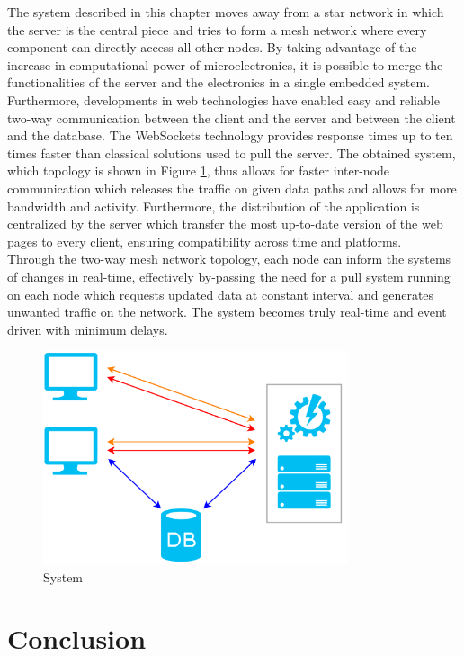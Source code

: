     The system described in this chapter moves away from a star network in which the server is the central piece and tries to form a mesh network where every component can directly access all other nodes. By taking advantage of the increase in computational power of microelectronics, it is possible to merge the functionalities of the server and the electronics in a single embedded system. Furthermore, developments in web technologies have enabled easy and reliable two-way communication between the client and the server and between the client and the database. The WebSockets technology provides response times up to ten times faster than classical solutions used to pull the server. The obtained system, which topology is shown in Figure \ref{fig:III-2-system-new}, thus allows for faster inter-node communication which releases the traffic on given data paths and allows for more bandwidth and activity. Furthermore, the distribution of the application is centralized by the server which transfer the most up-to-date version of the web pages to every client, ensuring compatibility across time and platforms. \\

    Through the two-way mesh network topology, each node can inform the systems of changes in real-time, effectively by-passing the need for a pull system running on each node which requests updated data at constant interval and generates unwanted traffic on the network. The system becomes truly real-time and event driven with minimum delays. 

    \begin{figure}[h!]
      \centering
      \includegraphics[width=0.8\textwidth]{img/III-2-web-daq/new-sys.png}
      \caption{System}
      \label{fig:III-2-system-new}
    \end{figure}

  \section{Conclusion}
